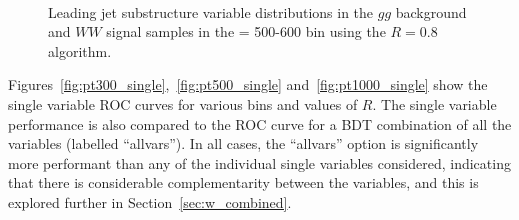 \begin{figure}
\centering
{}
\\
\caption{Leading jet substructure variable distributions in the $gg$
  background and $WW$ signal samples in the \pt = 500-600 \GeV bin using the \antikt $R=0.8$ algorithm.}
\label{fig:pt500_subst_AKt_R08}
\end{figure}


Figures~\ref{fig:pt300_single},~\ref{fig:pt500_single}
and~\ref{fig:pt1000_single} show the single variable ROC curves
for various \pt bins and values of $R$. The single variable performance is also
compared to the ROC curve for a BDT combination of all the variables
(labelled ``allvars''). In all cases, the ``allvars'' option
is significantly more performant than any of the individual single variables
considered, indicating that there is considerable complementarity
between the variables, and this is explored further in Section~\ref{sec:w_combined}.

